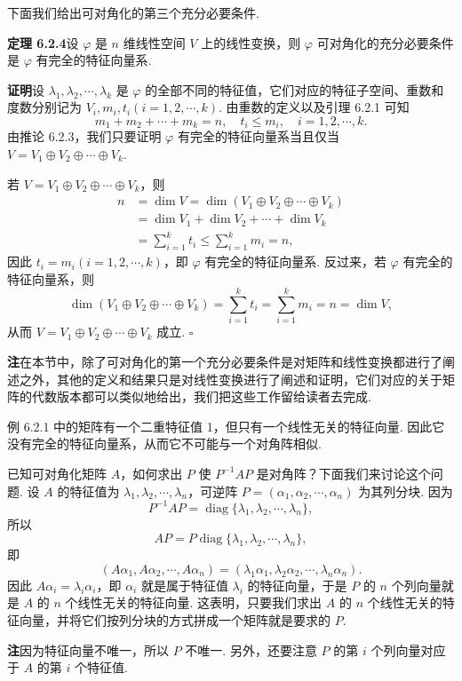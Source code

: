 \documentclass[UTF8,12pt,a4paper,fontset=fandol]{ctexart}
\begin{document}
下面我们给出可对角化的第三个充分必要条件.

\noindent\textbf{定理 6.2.4}\quad 设 $\varphi$ 是 $n$ 维线性空间 $V$ 上的线性变换，则 $\varphi$ 可对角化的充分必要条件是 $\varphi$ 有完全的特征向量系.

\noindent\textbf{证明}\quad 设 $\lambda_1,\lambda_2,\cdots,\lambda_k$ 是 $\varphi$ 的全部不同的特征值，它们对应的特征子空间、重数和度数分别记为 $V_i,m_i,t_i(i=1,2,\cdots,k)$. 由重数的定义以及引理 6.2.1 可知
\[
m_1+m_2+\cdots+m_k=n,\quad t_i\leq m_i,\quad i=1,2,\cdots,k.
\]
由推论 6.2.3，我们只要证明 $\varphi$ 有完全的特征向量系当且仅当 $V=V_1\oplus V_2\oplus\cdots\oplus V_k$.

若 $V=V_1\oplus V_2\oplus\cdots\oplus V_k$，则
\[
\begin{aligned}
n&=\dim V=\dim(V_1\oplus V_2\oplus\cdots\oplus V_k)\\
&=\dim V_1+\dim V_2+\cdots+\dim V_k\\
&=\sum_{i=1}^k t_i\leq \sum_{i=1}^k m_i=n,
\end{aligned}
\]
因此 $t_i=m_i(i=1,2,\cdots,k)$，即 $\varphi$ 有完全的特征向量系. 反过来，若 $\varphi$ 有完全的特征向量系，则
\[
\dim(V_1\oplus V_2\oplus\cdots\oplus V_k)=\sum_{i=1}^k t_i=\sum_{i=1}^k m_i=n=\dim V,
\]
从而 $V=V_1\oplus V_2\oplus\cdots\oplus V_k$ 成立. $\square$

\noindent\textbf{注}\quad 在本节中，除了可对角化的第一个充分必要条件是对矩阵和线性变换都进行了阐述之外，其他的定义和结果只是对线性变换进行了阐述和证明，它们对应的关于矩阵的代数版本都可以类似地给出，我们把这些工作留给读者去完成.

例 6.2.1 中的矩阵有一个二重特征值 1，但只有一个线性无关的特征向量. 因此它没有完全的特征向量系，从而它不可能与一个对角阵相似.

已知可对角化矩阵 $A$，如何求出 $P$ 使 $P^{-1}AP$ 是对角阵？下面我们来讨论这个问题. 设 $A$ 的特征值为 $\lambda_1,\lambda_2,\cdots,\lambda_n$，可逆阵 $P=(\alpha_1,\alpha_2,\cdots,\alpha_n)$ 为其列分块. 因为
\[
P^{-1}AP=\operatorname{diag}\{\lambda_1,\lambda_2,\cdots,\lambda_n\},
\]
所以
\[
AP=P\operatorname{diag}\{\lambda_1,\lambda_2,\cdots,\lambda_n\},
\]
即
\[
(A\alpha_1,A\alpha_2,\cdots,A\alpha_n)=(\lambda_1\alpha_1,\lambda_2\alpha_2,\cdots,\lambda_n\alpha_n).
\]
因此 $A\alpha_i=\lambda_i\alpha_i$，即 $\alpha_i$ 就是属于特征值 $\lambda_i$ 的特征向量，于是 $P$ 的 $n$ 个列向量就是 $A$ 的 $n$ 个线性无关的特征向量. 这表明，只要我们求出 $A$ 的 $n$ 个线性无关的特征向量，并将它们按列分块的方式拼成一个矩阵就是要求的 $P$.

\noindent\textbf{注}\quad 因为特征向量不唯一，所以 $P$ 不唯一. 另外，还要注意 $P$ 的第 $i$ 个列向量对应于 $A$ 的第 $i$ 个特征值.
\end{document}
